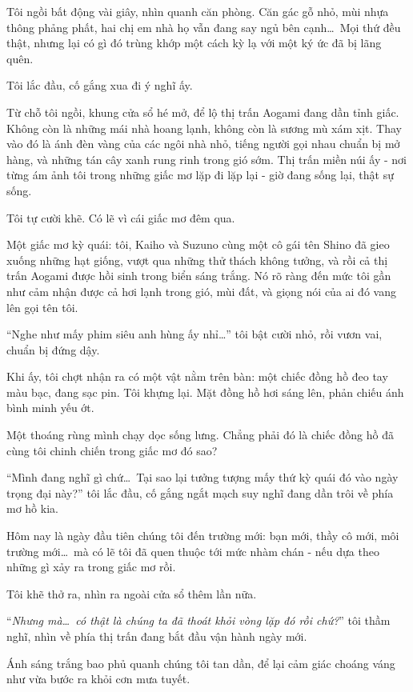 \documentclass[../main.tex]{subfiles}
\begin{document}
Tôi ngồi bất động vài giây, nhìn quanh căn phòng. Căn gác gỗ nhỏ, mùi nhựa thông phảng phất, hai chị em nhà họ vẫn đang say ngủ bên cạnh\dots\ Mọi thứ đều thật, nhưng lại có gì đó trùng khớp một cách kỳ lạ với một ký ức đã bị lãng quên.

Tôi lắc đầu, cố gắng xua đi ý nghĩ ấy.

Từ chỗ tôi ngồi, khung cửa sổ hé mở, để lộ thị trấn Aogami đang dần tỉnh giấc. Không còn là những mái nhà hoang lạnh, không còn là sương mù xám xịt. Thay vào đó là ánh đèn vàng của các ngôi nhà nhỏ, tiếng người gọi nhau chuẩn bị mở hàng, và những tán cây xanh rung rinh trong gió sớm. Thị trấn miền núi ấy - nơi từng ám ảnh tôi trong những giấc mơ lặp đi lặp lại - giờ đang sống lại, thật sự sống.

Tôi tự cười khẽ. Có lẽ vì cái giấc mơ đêm qua.

Một giấc mơ kỳ quái: tôi, Kaiho và Suzuno cùng một cô gái tên Shino đã gieo xuống những hạt giống, vượt qua những thử thách không tưởng, và rồi cả thị trấn Aogami được hồi sinh trong biển sáng trắng. Nó rõ ràng đến mức tôi gần như cảm nhận được cả hơi lạnh trong gió, mùi đất, và giọng nói của ai đó vang lên gọi tên tôi.

``Nghe như mấy phim siêu anh hùng ấy nhỉ\dots'' tôi bật cười nhỏ, rồi vươn vai, chuẩn bị đứng dậy.

Khi ấy, tôi chợt nhận ra có một vật nằm trên bàn: một chiếc đồng hồ đeo tay màu bạc, đang sạc pin. Tôi khựng lại. Mặt đồng hồ hơi sáng lên, phản chiếu ánh bình minh yếu ớt.

Một thoáng rùng mình chạy dọc sống lưng. Chẳng phải đó là chiếc đồng hồ đã cùng tôi chinh chiến trong giấc mơ đó sao?

``Mình đang nghĩ gì chứ\dots\ Tại sao lại tưởng tượng mấy thứ kỳ quái đó vào ngày trọng đại này?'' tôi lắc đầu, cố gắng ngắt mạch suy nghĩ đang dần trôi về phía mơ hồ kia.

Hôm nay là ngày đầu tiên chúng tôi đến trường mới: bạn mới, thầy cô mới, môi trường mới\dots\ mà có lẽ tôi đã quen thuộc tới mức nhàm chán - nếu dựa theo những gì xảy ra trong giấc mơ rồi.

Tôi khẽ thở ra, nhìn ra ngoài cửa sổ thêm lần nữa.

``\textit{Nhưng mà\dots\ có thật là chúng ta đã thoát khỏi vòng lặp đó rồi chứ?}'' tôi thầm nghĩ, nhìn về phía thị trấn đang bắt đầu vận hành ngày mới.

Ánh sáng trắng bao phủ quanh chúng tôi tan dần, để lại cảm giác choáng váng như vừa bước ra khỏi cơn mưa tuyết.
\end{document}
